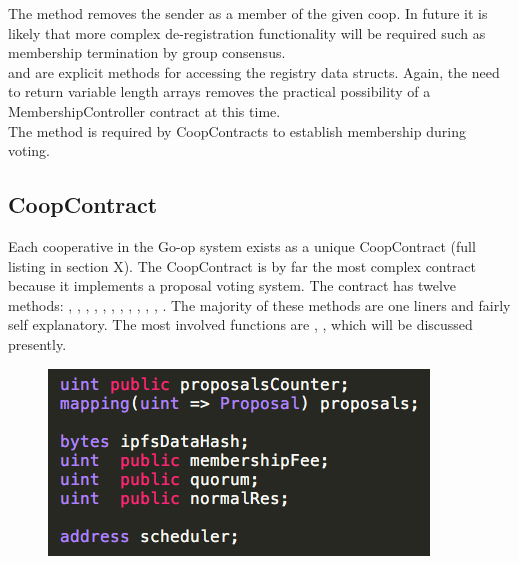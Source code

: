 The  method removes the sender as a member of the given coop. In future it is likely that more complex de-registration functionality will be required such as membership termination by group consensus.\\

 and  are explicit methods for accessing the registry data structs. Again, the need to return variable length arrays removes the practical possibility of a MembershipController contract at this time. \\

The  method is required by CoopContracts to establish membership during voting.\\

\subsection{CoopContract}
Each cooperative in the Go-op system exists as a unique CoopContract (full listing in section X). The CoopContract is by far the most complex contract because it implements a proposal voting system. The  contract has twelve methods: , , , , , , , , , , , . The majority of these methods are one liners and fairly self explanatory. The most involved functions are , ,  which will be discussed presently.\\
\begin{figure}
\centering
\includegraphics[width=\textwidth]{Figures/CoopState}
\decoRule
\caption[]{ }
\label{fig:CoopState}
\end{figure}

